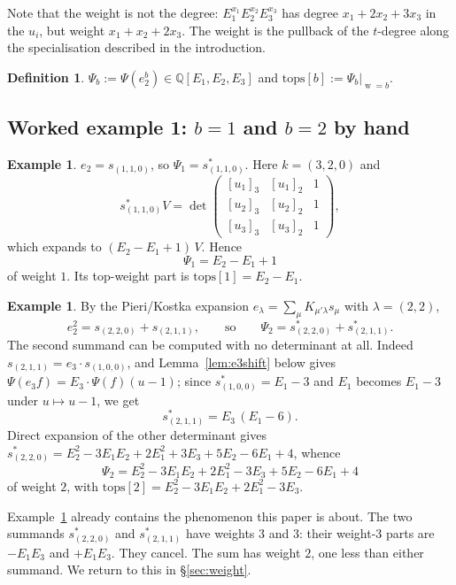 \documentclass[10pt]{article}
\theoremstyle{plain}
\theoremstyle{definition}
\newtheorem{definition}[theorem]{Definition}
\newtheorem{example}[theorem]{Example}
\newcommand{\bbQ}{\mathbb{Q}}
\newcommand{\ffal}[2]{[#1]_{#2}}
\newcommand{\wt}{\operatorname{w}}
\begin{document}
Note that the weight is not the degree: $E_1^{x_1}E_2^{x_2}E_3^{x_3}$ has degree
$x_1+2x_2+3x_3$ in the $u_i$, but weight $x_1+x_2+2x_3$. The weight is the pullback of the
$t$-degree along the specialisation described in the introduction.

\begin{definition}
$\Psi_b:=\Psi(e_2^b)\in\bbQ[E_1,E_2,E_3]$ and $\mathrm{tops}[b]:=\Psi_b|_{\wt=b}$.
\end{definition}

\subsection{Worked example 1: $b=1$ and $b=2$ by hand}\label{ex:one}

\begin{example}\label{ex:b1}
$e_2=s_{(1,1,0)}$, so $\Psi_1=s^*_{(1,1,0)}$. Here $k=(3,2,0)$ and
\[
 s^*_{(1,1,0)}V=\det\begin{pmatrix}
 \ffal{u_1}{3}&\ffal{u_1}{2}&1\\
 \ffal{u_2}{3}&\ffal{u_2}{2}&1\\
 \ffal{u_3}{3}&\ffal{u_3}{2}&1\end{pmatrix},
\]
which expands to $(E_2-E_1+1)\,V$. Hence
\[
 \boxed{\ \Psi_1=E_2-E_1+1\ }
\]
of weight $1$. Its top-weight part is $\mathrm{tops}[1]=E_2-E_1$.
\end{example}

\begin{example}\label{ex:b2}
By the Pieri/Kostka expansion $e_\lambda=\sum_\mu K_{\mu'\lambda}s_\mu$ with
$\lambda=(2,2)$,
\[
 e_2^2=s_{(2,2,0)}+s_{(2,1,1)},\qquad\text{so}\qquad \Psi_2=s^*_{(2,2,0)}+s^*_{(2,1,1)} .
\]
The second summand can be computed with no determinant at all. Indeed
$s_{(2,1,1)}=e_3\cdot s_{(1,0,0)}$, and Lemma~\ref{lem:e3shift} below gives
$\Psi(e_3 f)=E_3\cdot\Psi(f)(u-1)$; since $s^*_{(1,0,0)}=E_1-3$ and $E_1$ becomes $E_1-3$
under $u\mapsto u-1$, we get
\[
 s^*_{(2,1,1)}=E_3\,(E_1-6).
\]
Direct expansion of the other determinant gives
$s^*_{(2,2,0)}=E_2^2-3E_1E_2+2E_1^2+3E_3+5E_2-6E_1+4$, whence
\[
 \boxed{\ \Psi_2=E_2^2-3E_1E_2+2E_1^2-3E_3+5E_2-6E_1+4\ }
\]
of weight $2$, with $\mathrm{tops}[2]=E_2^2-3E_1E_2+2E_1^2-3E_3$.
\end{example}

Example~\ref{ex:b2} already contains the phenomenon this paper is about. The two summands
$s^*_{(2,2,0)}$ and $s^*_{(2,1,1)}$ have weights $3$ and $3$: their weight-$3$ parts are
$-E_1E_3$ and $+E_1E_3$. They cancel. The sum has weight $2$, one less than either
summand. We return to this in \S\ref{sec:weight}.
\end{document}
